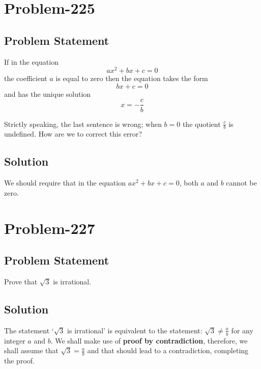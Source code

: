 \documentclass[12pt]{article}
\begin{document}
\section*{Problem-225}
\subsection*{Problem Statement}
If in the equation
\[
	ax^2 + bx + c = 0
\]
the coefficient $a$ is equal to zero then the equation takes the form
\[
	bx + c = 0
\]
and has the unique solution
\[
	x = -\frac{c}{b}
\]

Strictly speaking, the last sentence is wrong; when $b=0$ the quotient $\frac{c}{b}$ is undefined. How are we to correct this error?

\subsection*{Solution}
We should require that in the equation $ax^2+bx+c = 0$, both $a$ and $b$ cannot be zero.

\section*{Problem-227}
\subsection*{Problem Statement}
Prove that $\sqrt{3}$ is irrational.

\subsection*{Solution}
The statement `$\sqrt{3}$ is irrational' is equivalent to the statement: $\sqrt{3} \neq \frac{a}{b}$ for any integer $a$ and $b$. We shall make use of \textbf{proof by contradiction}, therefore, we shall assume that $\sqrt{3} = \frac{a}{b}$ and that should lead to a contradiction, completing the proof.
\end{document}
